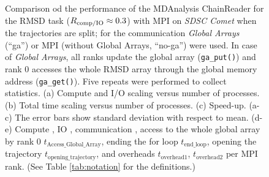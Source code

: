 \begin{figure}[ht!]
\caption{Comparison od the performance of the MDAnalysis ChainReader for the RMSD task ($R_{\text{comp/IO}} \approx 0.3$)  with MPI on \emph{SDSC Comet} when the trajectories are split; for the communication \emph{Global Arrays} (``ga'') or MPI (without Global Arrays, ``no-ga'') were used.
In case of \emph{Global Arrays}, all ranks update the global array (\texttt{ga\_put()}) and rank 0 accesses the whole RMSD array through the global memory address (\texttt{ga\_get()}).
Five repeats were performed to collect statistics.
(a) Compute and I/O scaling versus number of processes.
(b) Total time scaling versus number of processes.
(c) Speed-up.
(a-c) The error bars show standard deviation with respect to mean.
(d-e) Compute \tcomp, IO \tIO, communication \tcomm, access to the whole global array by rank 0 $t_{\text{Access\_Global\_Array}}$, ending the for loop $t_{\text{end\_loop}}$,  opening the trajectory $t_{\text{opening\_trajectory}}$, and overheads $t_{\text{overhead1}}$, $t_{\text{overhead2}}$ per MPI rank. (See Table \ref{tab:notation} for the definitions.)}
\label{fig:MPIwithIO-split-chain-reader}
\end{figure}

